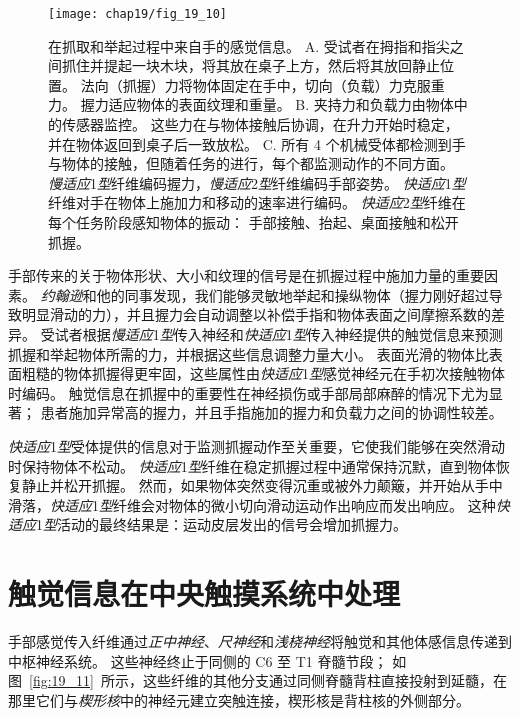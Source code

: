 \begin{figure}[htbp]
	\centering
	\texttt{[image: chap19/fig\_19\_10]}
	\caption{在抓取和举起过程中来自手的感觉信息\cite{johansson1996sensory}。
		A. 受试者在拇指和指尖之间抓住并提起一块木块，将其放在桌子上方，然后将其放回静止位置。
		法向（抓握）力将物体固定在手中，切向（负载）力克服重力。
		握力适应物体的表面纹理和重量。
		B. 夹持力和负载力由物体中的传感器监控。
		这些力在与物体接触后协调，在升力开始时稳定，并在物体返回到桌子后一致放松。
		C. 所有 4 个机械受体都检测到手与物体的接触，但随着任务的进行，每个都监测动作的不同方面。
		\textit{慢适应}1\textit{型}纤维编码握力，\textit{慢适应}2\textit{型}纤维编码手部姿势。
		\textit{快适应}1\textit{型}纤维对手在物体上施加力和移动的速率进行编码。
		\textit{快适应}2\textit{型}纤维在每个任务阶段感知物体的振动：
		手部接触、抬起、桌面接触和松开抓握。}
	\label{fig:19_10}
\end{figure}


手部传来的关于物体形状、大小和纹理的信号是在抓握过程中施加力量的重要因素。
\textit{约翰逊}和他的同事发现，我们能够灵敏地举起和操纵物体（握力刚好超过导致明显滑动的力），并且握力会自动调整以补偿手指和物体表面之间摩擦系数的差异。
受试者根据\textit{慢适应}1\textit{型}传入神经和\textit{快适应}1\textit{型}传入神经提供的触觉信息来预测抓握和举起物体所需的力，并根据这些信息调整力量大小。
表面光滑的物体比表面粗糙的物体抓握得更牢固，这些属性由\textit{快适应}1\textit{型}感觉神经元在手初次接触物体时编码。
触觉信息在抓握中的重要性在神经损伤或手部局部麻醉的情况下尤为显著；
患者施加异常高的握力，并且手指施加的握力和负载力之间的协调性较差。


\textit{快适应}1\textit{型}受体提供的信息对于监测抓握动作至关重要，它使我们能够在突然滑动时保持物体不松动。
\textit{快适应}1\textit{型}纤维在稳定抓握过程中通常保持沉默，直到物体恢复静止并松开抓握。
然而，如果物体突然变得沉重或被外力颠簸，并开始从手中滑落，\textit{快适应}1\textit{型}纤维会对物体的微小切向滑动运动作出响应而发出响应。
这种\textit{快适应}1\textit{型}活动的最终结果是：运动皮层发出的信号会增加抓握力。



\section{触觉信息在中央触摸系统中处理}

手部感觉传入纤维通过\textit{正中神经}、\textit{尺神经}和\textit{浅桡神经}将触觉和其他体感信息传递到中枢神经系统。
这些神经终止于同侧的 C6 至 T1 脊髓节段；
如图~\ref{fig:19_11}~所示，这些纤维的其他分支通过同侧脊髓背柱直接投射到延髓，在那里它们与\textit{楔形核}中的神经元建立突触连接，楔形核是背柱核的外侧部分。


